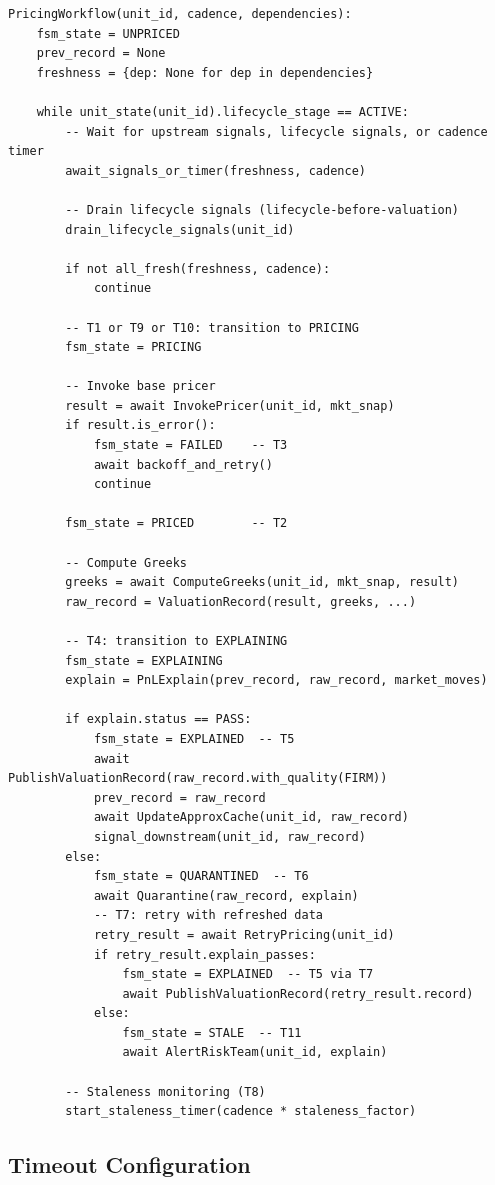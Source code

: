 \documentclass[11pt,a4paper]{article}
\begin{document}
\begin{lstlisting}
PricingWorkflow(unit_id, cadence, dependencies):
    fsm_state = UNPRICED
    prev_record = None
    freshness = {dep: None for dep in dependencies}

    while unit_state(unit_id).lifecycle_stage == ACTIVE:
        -- Wait for upstream signals, lifecycle signals, or cadence timer
        await_signals_or_timer(freshness, cadence)

        -- Drain lifecycle signals (lifecycle-before-valuation)
        drain_lifecycle_signals(unit_id)

        if not all_fresh(freshness, cadence):
            continue

        -- T1 or T9 or T10: transition to PRICING
        fsm_state = PRICING

        -- Invoke base pricer
        result = await InvokePricer(unit_id, mkt_snap)
        if result.is_error():
            fsm_state = FAILED    -- T3
            await backoff_and_retry()
            continue

        fsm_state = PRICED        -- T2

        -- Compute Greeks
        greeks = await ComputeGreeks(unit_id, mkt_snap, result)
        raw_record = ValuationRecord(result, greeks, ...)

        -- T4: transition to EXPLAINING
        fsm_state = EXPLAINING
        explain = PnLExplain(prev_record, raw_record, market_moves)

        if explain.status == PASS:
            fsm_state = EXPLAINED  -- T5
            await PublishValuationRecord(raw_record.with_quality(FIRM))
            prev_record = raw_record
            await UpdateApproxCache(unit_id, raw_record)
            signal_downstream(unit_id, raw_record)
        else:
            fsm_state = QUARANTINED  -- T6
            await Quarantine(raw_record, explain)
            -- T7: retry with refreshed data
            retry_result = await RetryPricing(unit_id)
            if retry_result.explain_passes:
                fsm_state = EXPLAINED  -- T5 via T7
                await PublishValuationRecord(retry_result.record)
            else:
                fsm_state = STALE  -- T11
                await AlertRiskTeam(unit_id, explain)

        -- Staleness monitoring (T8)
        start_staleness_timer(cadence * staleness_factor)
\end{lstlisting}

\subsection{Timeout Configuration}
\end{document}
